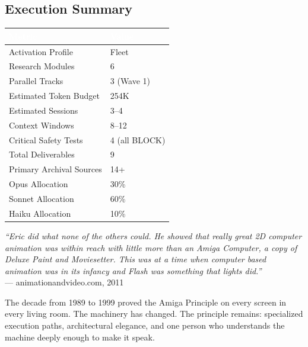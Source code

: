 \documentclass[11pt,letterpaper]{article}
\newcommand{\tableheader}[1]{\textbf{\sffamily\textcolor{white}{#1}}}
\begin{document}
\subsection{Execution Summary}

\begin{center}
\begin{tabularx}{\textwidth}{L{5cm}X}
\toprule
{}
\tableheader{Metric} & \tableheader{Value} \\
\midrule
Activation Profile & Fleet \\
Research Modules & 6 \\
Parallel Tracks & 3 (Wave 1) \\
Estimated Token Budget & 254K \\
Estimated Sessions & 3--4 \\
Context Windows & 8--12 \\
Critical Safety Tests & 4 (all BLOCK) \\
Total Deliverables & 9 \\
Primary Archival Sources & 14+ \\
Opus Allocation & 30\% \\
Sonnet Allocation & 60\% \\
Haiku Allocation & 10\% \\
\bottomrule
\end{tabularx}
\end{center}

\vspace{2em}

\begin{quotebox}
\textit{``Eric did what none of the others could. He showed that really great 2D computer animation was within reach with little more than an Amiga Computer, a copy of Deluxe Paint and Moviesetter. This was at a time when computer based animation was in its infancy and Flash was something that lights did.''} \\[0.5em]
\hfill --- animationandvideo.com, 2011

\vspace{0.8em}
\normalfont\sffamily\small\textcolor{accent}{The decade from 1989 to 1999 proved the Amiga Principle on every screen in every living room. The machinery has changed. The principle remains: specialized execution paths, architectural elegance, and one person who understands the machine deeply enough to make it speak.}
\end{quotebox}
\end{document}
